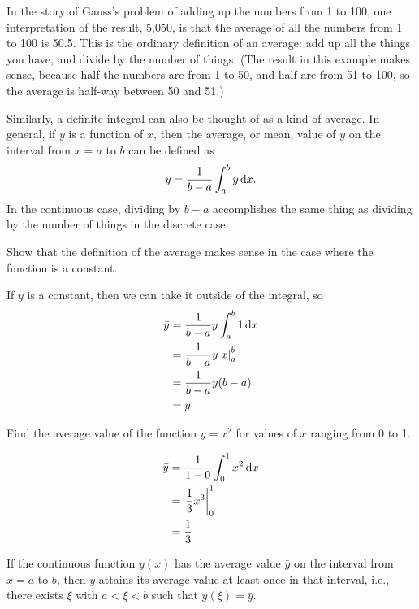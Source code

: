In the story of Gauss's problem of adding up the numbers from 1 to 100, one interpretation of
the result, 5,050, is that the average of all the numbers from 1 to 100 is 50.5. This is the
ordinary definition of an average: add up all the things you have, and divide by the number
of things. (The result in this example makes sense, because half the numbers
are from 1 to 50, and half are from 51 to 100, so the average is half-way between 50 and 51.)

Similarly, a definite integral can also be thought of as a kind of average. In general, if $y$ is
a function of $x$, then the average, or mean, value of $y$ on the interval from $x=a$ to $b$ can be
defined as
\begin{equation*}
  \bar{y} = \frac{1}{b-a} \int_a^b y\operatorname{d\!} x.
\end{equation*}
In the continuous case, dividing by $b-a$ accomplishes the same thing as dividing by the
number of things in the discrete case.

\begin{eg}
\egquestion Show that the definition of the average makes sense in the case where the function
is a constant.

\eganswer If $y$ is a constant, then we can take it outside of the integral, so
\begin{align*}
  \bar{y} &= \frac{1}{b-a} y \int_a^b 1\operatorname{d\!} x \\
                     &= \frac{1}{b-a} y \left.x\right|_a^b \\
                     &= \frac{1}{b-a} y (b-a) \\
                     &= y
\end{align*}
\end{eg}

\begin{eg}\label{eg:mean-of-square}
\egquestion Find the average value of the function $y=x^2$ for values of $x$ ranging from
0 to 1.

\begin{align*}
  \bar{y} &= \frac{1}{1-0} \int_0^1 x^2\operatorname{d\!} x \\
                     &= \left.\frac{1}{3}x^3\right|_0^1 \\
                     &= \frac{1}{3}
\end{align*}
\end{eg}

\begin{important}\label{mean-value-theorem-stated}
If the continuous function $y(x)$ has the average value $\bar{y}$ on the interval
from $x=a$ to $b$, then $y$ attains its average value at least once in that interval,
i.e., there exists $\xi$ with $a<\xi<b$ such that $y(\xi)=\bar{y}$.
\end{important}

